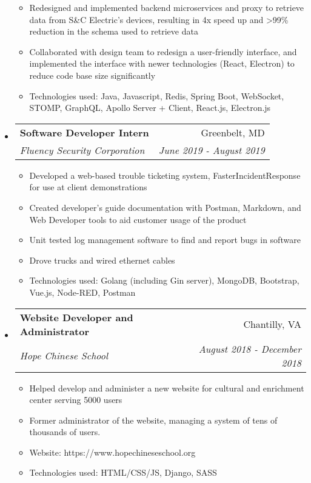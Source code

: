 \documentclass[letterpaper,11pt]{article}
\makeatletter
\newcommand{\resitem}[1]{\item #1 \vspace{-2pt}}
\newcommand{\ressubheading}[4]{
\begin{tabular*}{7.0in}{l@{\extracolsep{\fill}}r}
		\textbf{#1} & #2 \\
		\textit{#3} & \textit{#4} \\
\end{tabular*}\vspace{-6pt}}
\makeatother
\begin{document}
\begin{itemize}
\begin{itemize}
        \resitem{Redesigned and implemented backend microservices and proxy to retrieve data from S\&C Electric's devices, resulting in 4x speed up and >99\% reduction in the schema used to retrieve data}
        \resitem{Collaborated with design team to redesign a user-friendly interface, and implemented the interface with newer technologies (React, Electron) to reduce code base size significantly}
        \resitem{Technologies used: Java, Javascript, Redis, Spring Boot, WebSocket, STOMP, GraphQL, Apollo Server + Client, React.js, Electron.js}
    \end{itemize}
\item
    \ressubheading{Software Developer Intern}{Greenbelt, MD}{Fluency Security Corporation}{June 2019 - August 2019}
	\begin{itemize}
	    \resitem{Developed a web-based trouble ticketing system, FasterIncidentResponse for use at client demonstrations}
		\resitem{Created developer's guide documentation with Postman, Markdown, and Web Developer tools to aid customer usage of the product}
		\resitem{Unit tested log management software to find and report bugs in software}
		\resitem{Drove trucks and wired ethernet cables}
		\resitem{Technologies used: Golang (including Gin server), MongoDB, Bootstrap, Vue.js, Node-RED, Postman}
	\end{itemize}
\item
    \ressubheading{Website Developer and Administrator}{Chantilly, VA}{Hope Chinese School}{August 2018 - December 2018}
	\begin{itemize}
	    \resitem{Helped develop and administer a new website for cultural and enrichment center serving 5000 users}
		\resitem{Former administrator of the website, managing a system of tens of thousands of users.}
		\resitem{Website: https://www.hopechineseschool.org}
		\resitem{Technologies used: HTML/CSS/JS, Django, SASS}
	\end{itemize}
\end{itemize}

\end{document}
